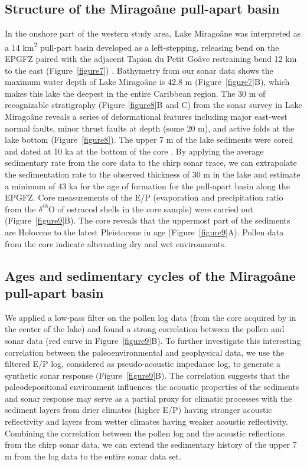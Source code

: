 \documentclass[linenumbers,draft]{agujournal}
\begin{document}
\subsection{Structure of the Mirago\^ane pull-apart basin}
In the onshore part of the western study area, Lake Mirago\^ane was interpreted as a 14 km\textsuperscript{2} pull-part basin developed as a left-stepping, releasing bend on the EPGFZ paired with the adjacent Tapion du Petit Go\^ave restraining bend 12 km to the east (Figure~\ref{figure7}) \citep{mann1995actively,cowgill2012interactive}. Bathymetry from our sonar data shows the maximum water depth of Lake Mirago\^ane is 42.8 m (Figure~\ref{figure7}B), which makes this lake the deepest \citep{higuera199910} in the entire Caribbean region. The 30 m of recognizable stratigraphy (Figure \ref{figure8}B and C) from the sonar survey in Lake Mirago\^ane reveals a series of deformational features including major east-west normal faults, minor thrust faults at depth (some 20 m), and active folds at the lake bottom (Figure~\ref{figure8}). The upper 7 m of the lake sediments were cored and dated at 10 ka at the bottom of the core \citep{higuera199910}. By applying the average sedimentary rate from the core data to the chirp sonar trace, we can extrapolate the sedimentation rate to the observed thickness of 30 m in the lake and estimate a minimum of 43 ka for the age of formation for the pull-apart basin along the EPGFZ. Core measurements of the E/P (evaporation and precipitation ratio from the $\delta^{18}$O of ostracod shells in the core sample) were carried out \citep{higuera199910} (Figure~\ref{figure9}B). The core reveals that the uppermost part of the sediments are Holocene to the latest Pleistocene in age (Figure~\ref{figure9}A). Pollen data from the core indicate alternating dry and wet environments.

\subsection{Ages and sedimentary cycles of the Mirago\^ane pull-apart basin}
We applied a low-pass filter on the pollen log data (from the core acquired by \citet{higuera199910} in the center of the lake) and found a strong correlation between the pollen and sonar data (red curve in Figure~\ref{figure9}B). To further investigate this interesting correlation between the paleoenvironmental and geophysical data, we use the filtered E/P log, considered as pseudo-acoustic impedance log, to generate a synthetic sonar response (Figure~\ref{figure9}B). The correlation suggests that the paleodepositional environment influences the acoustic properties of the sediments and sonar response may serve as a partial proxy for climatic processes with the sediment layers from drier climates (higher E/P) having stronger acoustic reflectivity and layers from wetter climates having weaker acoustic reflectivity. Combining the correlation between the pollen log and the acoustic reflections from the chirp sonar data, we can extend the sedimentary history of the upper 7 m from the log data to the entire sonar data set. 
\end{document}
